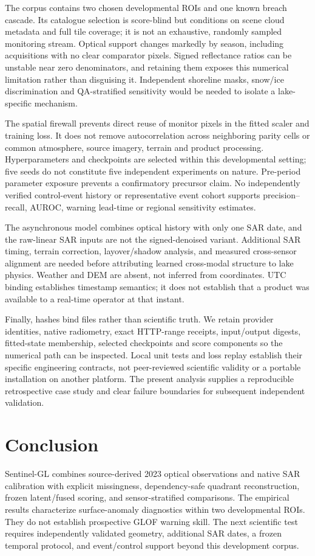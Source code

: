 \documentclass[10pt,twocolumn]{article}
\begin{document}
The corpus contains two chosen developmental ROIs and one known breach cascade. Its catalogue selection is score-blind but conditions on scene cloud metadata and full tile coverage; it is not an exhaustive, randomly sampled monitoring stream. Optical support changes markedly by season, including acquisitions with no clear comparator pixels. Signed reflectance ratios can be unstable near zero denominators, and retaining them exposes this numerical limitation rather than disguising it. Independent shoreline masks, snow/ice discrimination and QA-stratified sensitivity would be needed to isolate a lake-specific mechanism.

The spatial firewall prevents direct reuse of monitor pixels in the fitted scaler and training loss. It does not remove autocorrelation across neighboring parity cells or common atmosphere, source imagery, terrain and product processing. Hyperparameters and checkpoints are selected within this developmental setting; five seeds do not constitute five independent experiments on nature. Pre-period parameter exposure prevents a confirmatory precursor claim. No independently verified control-event history or representative event cohort supports precision--recall, AUROC, warning lead-time or regional sensitivity estimates.

The asynchronous model combines optical history with only one SAR date, and the raw-linear SAR inputs are not the signed-denoised variant. Additional SAR timing, terrain correction, layover/shadow analysis, and measured cross-sensor alignment are needed before attributing learned cross-modal structure to lake physics. Weather and DEM are absent, not inferred from coordinates. UTC binding establishes timestamp semantics; it does not establish that a product was available to a real-time operator at that instant.

Finally, hashes bind files rather than scientific truth. We retain provider identities, native radiometry, exact HTTP-range receipts, input/output digests, fitted-state membership, selected checkpoints and score components so the numerical path can be inspected. Local unit tests and loss replay establish their specific engineering contracts, not peer-reviewed scientific validity or a portable installation on another platform. The present analysis supplies a reproducible retrospective case study and clear failure boundaries for subsequent independent validation.

\section{Conclusion}
Sentinel-GL combines source-derived 2023 optical observations and native SAR calibration with explicit missingness, dependency-safe quadrant reconstruction, frozen latent/fused scoring, and sensor-stratified comparisons. The empirical results characterize surface-anomaly diagnostics within two developmental ROIs. They do not establish prospective GLOF warning skill. The next scientific test requires independently validated geometry, additional SAR dates, a frozen temporal protocol, and event/control support beyond this development corpus.
\end{document}
